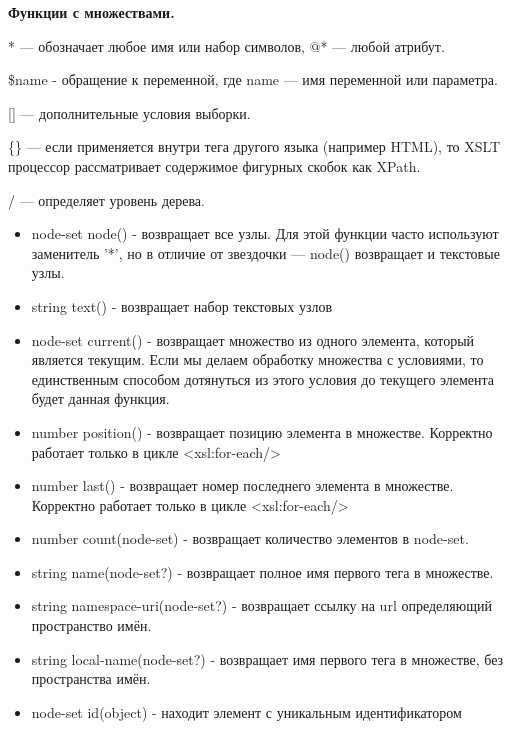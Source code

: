 \documentclass[12pt,a4paper,oneside]{article} %
\begin{document}
\textbf{Функции с множествами.}

* — обозначает любое имя или набор символов, @* — любой атрибут.

\$name - обращение к переменной, где name — имя переменной  \linebreak
или параметра.

[] — дополнительные условия выборки.

\{\} — если применяется внутри тега другого языка (например HTML),  \linebreak
то XSLT процессор рассматривает содержимое фигурных скобок как XPath.

/ — определяет уровень дерева.
\begin{itemize}
\item node-set node() - возвращает все узлы. Для этой функции часто  \linebreak
используют заменитель '*', но в отличие от звездочки — node()  \linebreak
возвращает и текстовые узлы.
\item string text() - возвращает набор текстовых узлов
\item node-set current() - возвращает множество из одного элемента,  \linebreak
который является текущим. Если мы делаем обработку множества с  \linebreak
условиями, то единственным способом дотянуться из этого условия  \linebreak
до текущего элемента будет данная функция.
\item number position() - возвращает позицию элемента в множестве. \linebreak
 Корректно работает только в цикле <xsl:for-each/>
\item number last() - возвращает номер последнего элемента в  \linebreak
множестве. Корректно работает только в цикле <xsl:for-each/>
\item number count(node-set) - возвращает количество элементов в node-set.
\item string name(node-set?) - возвращает полное имя первого тега  \linebreak
в множестве.
\item string namespace-uri(node-set?) - возвращает ссылку на url  \linebreak
определяющий пространство имён.
\item string local-name(node-set?) - возвращает имя первого тега  \linebreak
в множестве, без пространства имён.
\item node-set id(object) - находит элемент с уникальным идентификатором
\end{itemize}
\end{document}
